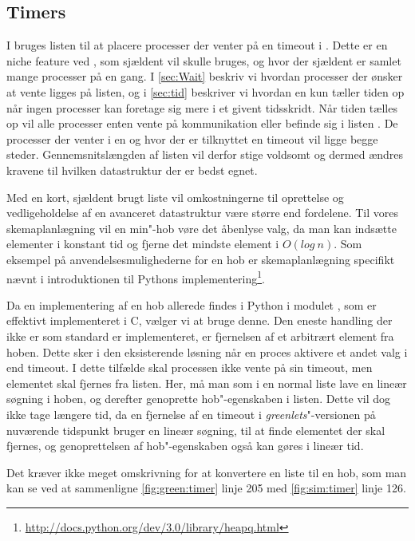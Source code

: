 \subsection{Timers}  
I \pycsp bruges listen  til at placere processer der venter på en timeout i . Dette er en niche feature ved \pycsp, som  sjældent vil skulle bruges, og hvor der sjældent er samlet mange processer på en gang. 
 I \cref{sec:Wait} beskriv vi hvordan processer der ønsker at vente ligges på  listen, og i \cref{sec:tid} beskriver vi hvordan \sched en kun tæller tiden op når ingen processer kan foretage sig mere i et givent tidsskridt. Når tiden tælles op vil  alle processer enten vente på kommunikation eller befinde sig i listen . De processer der venter i en  og hvor der er tilknyttet en timeout vil ligge begge steder. Gennemsnitslængden af listen vil derfor stige voldsomt og dermed ændres kravene til hvilken  datastruktur der er bedst egnet. 
 
Med en kort, sjældent brugt liste vil omkostningerne til oprettelse og vedligeholdelse af en avanceret datastruktur være større end fordelene. Til vores skemaplanlægning  vil en min"-hob vøre det åbenlyse valg, da  man kan  indsætte elementer i konstant tid og fjerne det mindste element i $O(log\ n)$. Som eksempel på anvendelsesmulighederne for en hob er skemaplanlægning specifikt nævnt i introduktionen til Pythons implementering\footnote{\url{http://docs.python.org/dev/3.0/library/heapq.html}}.  

Da en implementering af en hob allerede findes i Python i modulet , som er effektivt implementeret i C, vælger vi at bruge denne. Den eneste handling
der ikke er som standard er implementeret, er fjernelsen af et arbitrært element fra hoben. Dette sker i den eksisterende løsning når en proces
aktivere et andet valg i  end timeout. I dette tilfælde skal
processen ikke vente på sin timeout, men elementet skal fjernes fra
 listen. Her, må man som i
en normal liste lave en lineær søgning i hoben, og derefter genoprette
hob"-egenskaben i listen. Dette vil dog ikke tage længere tid, da en fjernelse af en timeout i \emph{greenlets}"-versionen på nuværende
tidspunkt bruger en lineær søgning, til at finde elementet der skal
fjernes, og genoprettelsen af hob"-egenskaben også kan gøres i lineær tid.

Det kræver ikke meget omskrivning for at konvertere en liste til en hob, som man kan se ved at sammenligne \cref{fig:green:timer} linje 205 med \cref{fig:sim:timer} linje 126. 

